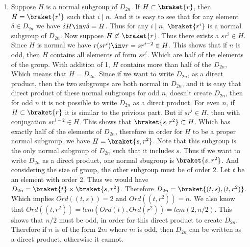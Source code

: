 \begin{enumerate}[label=]
    \item
        Suppose $H$ is a normal subgroup of $D_{2n}$. If $H \subset \braket{r}$, then $H = \braket{r^i}$ such that $i \mid n$. And it is easy to see that for any element $\delta \in D_{2n}$ we have $\delta H \inv \delta = H$. Thus for any $i \mid n$, $\braket{r^i}$ is a normal subgroup of $D_{2n}$.
        Now suppose $H \not \subset \braket{r}$. Thus there exists a $sr^i \in H$. Since $H$ is normal we have $r (sr^i) \inv r  = sr^{i - 2}\in H$. This shows that if $n$ is odd, then $H$ contains all elements of form $sr^i$. Which are half of the elements of the group. With addition of 1, $H$ contains more than half of the $D_{2n}$, Which means that $H = D_{2n}$. Since if we want to write $D_{2n}$, as a direct product, then the two subgroups are both normal in $D_{2n}$, and it is easy that direct product of these normal subgroups for odd $n$, doesn't create $D_{2n}$, then for odd $n$ it is not possible to write $D_{2n}$ as a direct product. For even $n$, if $H \subset \braket{r}$ it is similar to the privious part. But if $sr^i \in H$, then with conjugation $sr^{i - 2} \in H$. This shows that $\braket{s, r^2} \subset H$. Which has exactly half of the elements of $D_{2n}$, therefore in order for $H$ to be a proper normal subgroup, we have $H = \braket{s, r^2}$. Note that this subgroup is the only normal subgroup of $D_{2n}$ such that it includes $s$. Thus if we want to write $D_{2n}$ as a direct product, one normal sbugroup is $\braket{s, r^2}$. And considering the size of group, the other subgroup must be of order 2. Let $t$ be an element with order 2. Thus we would have $D_{2n} = \braket{t} \times \braket{s, r^2}$. Therefore $D_{2n} = \braket{(t, s), (t, r^2)}$. Which implies $Ord((t, s)) = 2$ and $Ord((t, r^2)) = n$. We also know that $Ord((t, r^2)) = lcm(Ord(t), Ord(r^2)) = lcm(2, n/2)$. This shows that $n/2$ must be odd, in order for this direct product to create $D_{2n}$. Therefore if $n$ is of the form $2m$ where $m$ is odd, then $D_{2n}$ can be written as a direct product, otherwise it cannot.
\end{enumerate}